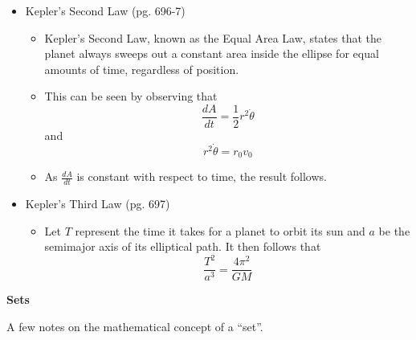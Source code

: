 \documentclass[12pt]{article}
\theoremstyle{plain}
\theoremstyle{definition}
\theoremstyle{remark}
\begin{document}
\begin{itemize}
	\item Kepler's Second Law (pg. 696-7)
	
		\begin{itemize}
		\item Kepler's Second Law, known as the Equal Area Law, states that the planet always sweeps out a constant area inside the ellipse for equal amounts of time, regardless of position.
		\item This can be seen by observing that \[\frac{dA}{dt} = \frac{1}{2}r^2\dot\theta\] and \[r^2\dot\theta = r_0v_0\]
		\item As $\frac{dA}{dt}$ is constant with respect to time, the result follows.
		\end{itemize}
		
	\item Kepler's Third Law (pg. 697)
	
		\begin{itemize}
		\item Let $T$ represent the time it takes for a planet to orbit its sun and $a$ be the semimajor axis of its elliptical path. It then follows that \[\frac{T^2}{a^3}=\frac{4\pi^2}{GM}\]
		\end{itemize}
		
	\end{itemize}
	
	\newpage
	
	\centerline{\bf Sets}
	
	A few notes on the mathematical concept of a ``set''.
	
\end{document}
